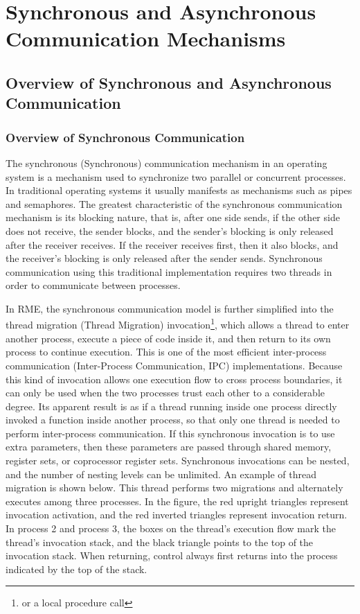 \chapter{Synchronous and Asynchronous Communication Mechanisms}\label{ch:sync-async-communication}

\section{Overview of Synchronous and Asynchronous Communication}\label{sec:5-sync-async-overview}

\subsection{Overview of Synchronous Communication}\label{subsec:5-sync-communication-overview}

The synchronous (Synchronous) communication mechanism in an operating system is a mechanism used to synchronize two parallel or concurrent processes. In traditional operating systems it usually manifests as mechanisms such as pipes and semaphores. The greatest characteristic of the synchronous communication mechanism is its blocking nature, that is, after one side sends, if the other side does not receive, the sender blocks, and the sender's blocking is only released after the receiver receives. If the receiver receives first, then it also blocks, and the receiver's blocking is only released after the sender sends. Synchronous communication using this traditional implementation requires two threads in order to communicate between processes.

In RME, the synchronous communication model is further simplified into the thread migration (Thread
Migration) invocation\footnote{or a local procedure call}, which allows a thread to enter another process, execute a piece of code inside it, and then return to its own process to continue execution. This is one of the most efficient inter-process communication (Inter-Process
Communication, IPC) implementations. Because this kind of invocation allows one execution flow to cross process boundaries, it can only be used when the two processes trust each other to a considerable degree. Its apparent result is as if a thread running inside one process directly invoked a function inside another process, so that only one thread is needed to perform inter-process communication. If this synchronous invocation is to use extra parameters, then these parameters are passed through shared memory, register sets, or coprocessor register sets. Synchronous invocations can be nested, and the number of nesting levels can be unlimited. An example of thread migration is shown below. This thread performs two migrations and alternately executes among three processes. In the figure, the red upright triangles represent invocation activation, and the red inverted triangles represent invocation return. In process 2 and process 3, the boxes on the thread's execution flow mark the thread's invocation stack, and the black triangle points to the top of the invocation stack. When returning, control always first returns into the process indicated by the top of the stack.

